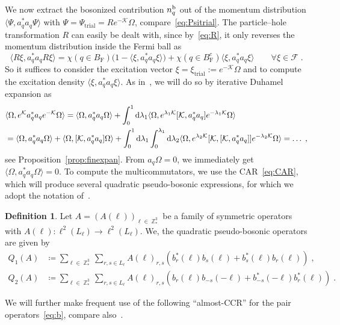 \documentclass[12pt,a4paper]{article}
\numberwithin{equation}{section}
\newcommand{\cF}{\mathcal{F}}
\newcommand{\cK}{\mathcal{K}}
\newcommand{\1}{\mathbb{I}}
\renewcommand{\b}{\textnormal{b}}
\newcommand{\di}{\textnormal{d}}
\newcommand{\F}{\mathrm{F}}
\newcommand{\trial}{\mathrm{trial}}
\DeclareMathOperator{\Z}{\mathbb{Z}}
\theoremstyle{plain}
\theoremstyle{definition}
\newtheorem{definition}[theorem]{Definition}
\theoremstyle{remark}
\theoremstyle{plain}
\theoremstyle{definition}
\theoremstyle{remark}
\begin{document}
We now extract the bosonized contribution $ n_q^{\b} $ out of the momentum distribution $ \langle \Psi, a_q^* a_q \Psi \rangle $ with $ \Psi = \Psi_{\trial} = R e^{-\cK} \Omega $, compare~\eqref{eq:Psitrial}. The particle--hole transformation $ R $ can easily be dealt with, since by~\eqref{eq:R}, it only reverses the momentum distribution inside the Fermi ball as
\begin{equation} \label{eq:momentum_dist_R_trafo}
	\langle R \xi, a_q^* a_q R \xi \rangle
	= \chi(q \in B_{\F}) \big( 1 - \langle \xi, a_q^* a_q \xi \rangle \big)
		+ \chi(q \in B_{\F}^c) \langle \xi, a_q^* a_q \xi \rangle \qquad
		\forall \xi \in \cF \;.
\end{equation}
So it suffices to consider the excitation vector $ \xi = \xi_{\trial} := e^{-\cK} \Omega $ and to compute the excitation density $ \langle \xi, a_q^* a_q \xi \rangle $. As in~\cite{BL25}, we will do so by iterative Duhamel expansion as
\begin{equation} \label{eq:duhamelexpansion_blueprint}
\begin{aligned}
	&\langle \Omega, e^{\cK} a_q^* a_q e^{-\cK} \Omega \rangle
	= \langle \Omega, a_q^* a_q \Omega \rangle
		+ \int_0^1 \di \lambda_1 \langle \Omega, e^{\lambda_1 \cK} [\cK, a_q^* a_q] e^{-\lambda_1 \cK} \Omega \rangle \\
	&= \langle \Omega, a_q^* a_q \Omega \rangle
		+ \langle \Omega, [\cK, a_q^* a_q] \Omega \rangle
		+ \int_0^1 \di \lambda_1 \int_0^{\lambda_1} \di \lambda_2 \langle \Omega, e^{\lambda_2 \cK} [\cK,[\cK, a_q^* a_q]] e^{-\lambda_2 \cK} \Omega \rangle
	= \ldots \;,
\end{aligned}
\end{equation}
see Proposition~\ref{prop:finexpan}. From $ a_q \Omega = 0 $, we immediately get $ \langle \Omega, a_q^* a_q \Omega \rangle = 0 $. To compute the multicommutators, we use the CAR~\eqref{eq:CAR}, which will produce several quadratic pseudo-bosonic expressions, for which we adopt the notation of~\cite{CHN21}.

\begin{definition} \label{def:Q}
Let $A=(A(\ell))_{\ell \in \Z^3_*} $ be a family of symmetric operators with $A(\ell): \ell^2(L_\ell)\rightarrow \ell^2(L_\ell)$. We, the quadratic pseudo-bosonic operators are given by
\begin{equation} \label{eq:Q}
\begin{aligned}
    Q_1(A)&\coloneq  \sum\limits_{\ell \in \Z^3_*}\sum\limits_{r,s \in L_{\ell}}A(\ell)_{r,s} \left(b^*_r(\ell)b_{s}(\ell)+b^*_{s}(\ell)b_{r}(\ell)\right) \;,\\ 
    Q_2(A)&\coloneq  \sum\limits_{\ell \in \Z^3_*}\sum\limits_{r,s \in L_{\ell}}A(\ell)_{r,s} \left(b_r(\ell)b_{-s}(-\ell)+b^*_{-s}(-\ell)b^*_{r}(\ell)\right) \;.
\end{aligned}
\end{equation} 
\end{definition}
We will further make frequent use of the following ``almost-CCR'' for the pair operators~\eqref{eq:b}, compare also~\cite[(1.66)]{CHN21}.
\end{document}
